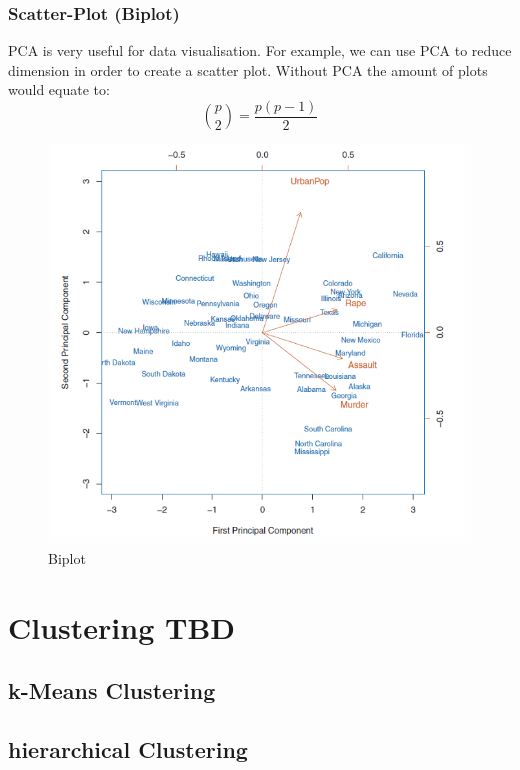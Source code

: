 \documentclass[../Main.tex]{subfiles}
\begin{document}

\subsubsection{Scatter-Plot (Biplot)}
PCA is very useful for data visualisation. For example, we
can use PCA to reduce dimension in order to create a scatter plot.
Without PCA the amount of plots would equate to:
\begin{equation}
    \binom{p}{2} = \frac{p(p-1)}{2}
\end{equation}

\begin{figure}[H]
    \centering
    \includegraphics[width=0.5\linewidth]{Images/biplot.png}
    \caption{Biplot}
\end{figure}


\section{Clustering TBD}
\subsection{k-Means Clustering}
\subsection {hierarchical Clustering}
\end{document}
